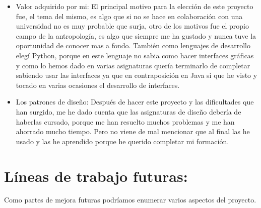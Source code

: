 \begin{itemize}
\item Valor adquirido por mi: 
El principal motivo para la elección de este proyecto fue, el tema del mismo, es algo que si no se hace en colaboración con una universidad no es muy probable que surja, otro de los motivos fue el propio campo de la antropología, es algo que siempre me ha gustado y nunca tuve la oportunidad de conocer mas a fondo.
También como lenguajes de desarrollo elegí Python, porque en este lenguaje no sabia como hacer interfaces gráficas y como lo hemos dado en varias asignaturas quería terminarlo de completar sabiendo usar las interfaces ya que en contraposición en Java si que he visto y tocado en varias ocasiones el desarrollo de interfaces.

\item Los patrones de diseño:
Después de hacer este proyecto y las dificultades que han surgido, me he dado cuenta que las asignaturas de diseño debería de haberlas cursado, porque me han resuelto muchos problemas y me han ahorrado mucho tiempo.
Pero no viene de mal mencionar que al final las he usado y las he aprendido porque he querido completar mi formación.


\end{itemize}



\section{Líneas de trabajo futuras:}
Como partes de mejora futuras podríamos enumerar varios aspectos del proyecto.

